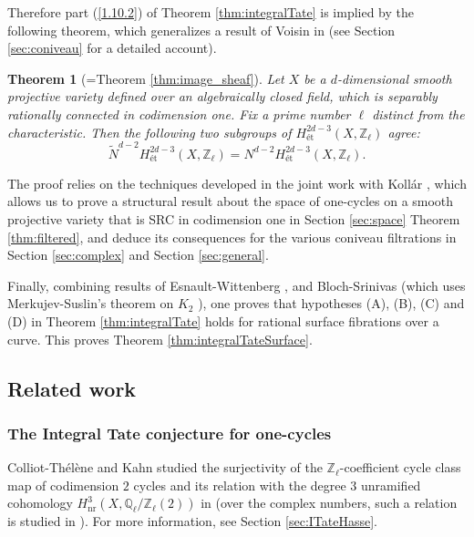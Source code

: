 \documentclass{amsart}
\newtheorem{thm}[theorem]{Theorem}
\theoremstyle{definition}
\theoremstyle{remark}
\newcommand{\mbb}{\mathbb}
\newcommand{\QQ}{\mbb{Q}}
\newcommand{\ZZ}{\mbb{Z}}
\newcommand{\et}{\text{\'et}}
\begin{document}
Therefore part (\ref{1.10.2}) of Theorem \ref{thm:integralTate} is implied by the following theorem, which generalizes a result of Voisin in \cite{VoisinConiveau} (see Section \ref{sec:coniveau} for a detailed account).
\begin{thm}[=Theorem \ref{thm:image_sheaf}]
Let $X$ be a $d$-dimensional smooth projective variety defined over an algebraically closed field, which is separably rationally connected in codimension one. Fix a prime number $\ell$ distinct from the characteristic.
Then the following two subgroups of $H^{2d-3}_\et(X, \ZZ_\ell)
$ agree:
\[
\tilde{N}^{d-2}H_{\et}^{2d-3}(X, \ZZ_\ell)=N^{d-2}H^{2d-3}_\et(X, \ZZ_\ell).
\]
\end{thm}
 The proof relies on the techniques developed in the joint work with Koll\'ar \cite{Kollar_Tian}, which allows us to prove a structural result about the space of  one-cycles on a smooth projective variety  that is SRC in codimension one in Section \ref{sec:space} Theorem \ref{thm:filtered}, and deduce its consequences for the various coniveau filtrations in Section \ref{sec:complex} and Section \ref{sec:general}.

 Finally, combining results of Esnault-Wittenberg \cite{WittenbergEsnault_0_cycle}, and Bloch-Srinivas \cite{BlochSrinivas} (which uses Merkujev-Suslin's theorem on $K_2$ \cite[Theorem 11.5]{Merkujev_Suslin}), one proves that hypotheses (A), (B), (C) and (D) in Theorem \ref{thm:integralTate} holds for rational surface fibrations over a curve. This proves Theorem \ref{thm:integralTateSurface}.







\subsection{Related work}
\subsubsection{The Integral Tate conjecture for one-cycles}

 Colliot-Th\'el\`ene and Kahn studied the surjectivity of the $\ZZ_\ell$-coefficient cycle class map of codimension $2$ cycles and its relation with the degree $3$ unramified cohomology $H^3_{\text{nr}}(X, \QQ_\ell/\ZZ_\ell(2))$ in \cite{CTKahnCycleCodim2} (over the complex numbers, such a relation is studied in \cite{CTVoisin}). For more information, see Section \ref{sec:ITateHasse}.
\end{document}
